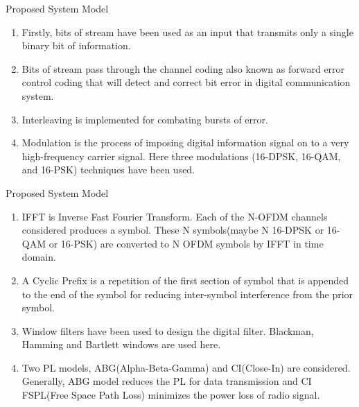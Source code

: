 \documentclass{beamer}
\begin{document}
\begin{frame}{Proposed System Model}
   \begin{block}{}
   \begin{enumerate}
       \item Firstly, bits of stream have been used as an input that transmits only a single binary bit of information.
       \item Bits of stream pass through the channel coding also known as forward error control coding that will detect and correct bit error in digital communication system.
       \item Interleaving is implemented for combating bursts of error.
       \item Modulation is the process of imposing digital information signal on to a very high-frequency carrier signal. Here three modulations (16-DPSK, 16-QAM, and 16-PSK) techniques have been used. 
   \end{enumerate}
   \end{block}
\end{frame}

\begin{frame}{Proposed System Model}
  \begin{block}{}
  \begin{enumerate}
      \item IFFT is Inverse Fast Fourier Transform. Each of the N-OFDM channels considered produces a symbol. These N symbols(maybe N 16-DPSK or 16-QAM or 16-PSK) are converted to N OFDM symbols by IFFT in time domain.
      \item A Cyclic Prefix is a repetition of the first section of symbol that is appended to the end of the symbol for
      reducing inter-symbol interference from the prior symbol.
      \item Window filters have been used to design the digital filter. Blackman, Hamming and Bartlett windows are used here.
      \item Two PL models, ABG(Alpha-Beta-Gamma) and CI(Close-In) are considered. Generally, ABG model reduces the PL for data transmission and CI FSPL(Free Space Path Loss) minimizes the power loss of radio signal.  
  \end{enumerate}
  \end{block}
\end{frame}
\end{document}
